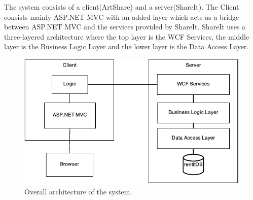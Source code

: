 \documentclass[../report.tex]{subfiles}
\begin{document}
The system consists of a client(ArtShare) and a server(ShareIt). 
The Client consists mainly ASP.NET MVC with an added layer which acts as a bridge between ASP.NET MVC and the services provided by ShareIt. 
ShareIt uses a three-layered architecture where the top layer is the WCF Services, the middle layer is the Business Logic Layer and the lower layer is the Data Access Layer.
\begin{figure}[H]
\centering
\includegraphics{img/overall_architecture.pdf}
\caption{Overall architecture of the system.}
\end{figure}
\end{document}
